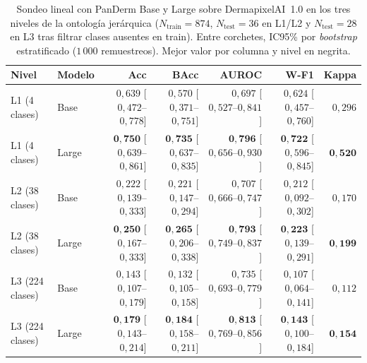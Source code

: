 \begin{table}[H]
\centering
\footnotesize
\setlength{\tabcolsep}{4pt}
\renewcommand{\arraystretch}{0.95}
\caption{Sondeo lineal con PanDerm Base y Large sobre
DermapixelAI~1.0 en los tres niveles de la ontología jerárquica
($N_{\mathrm{train}} = 874$, $N_{\mathrm{test}} = 36$ en L1/L2 y
$N_{\mathrm{test}} = 28$ en L3 tras filtrar clases ausentes en
train). Entre corchetes, IC95\% por \emph{bootstrap} estratificado
($1\,000$ remuestreos). Mejor valor por columna y nivel en
negrita.}
\label{tab:dermapixel-lp}
\begin{tabular}{llrrrrr}
\hline
Nivel & Modelo & Acc & BAcc & AUROC & W-F1 & Kappa \\
\hline
L1 (4 clases)   & Base  & $0{,}639$ [$0{,}472$--$0{,}778$]
                        & $0{,}570$ [$0{,}371$--$0{,}751$]
                        & $0{,}697$ [$0{,}527$--$0{,}841$]
                        & $0{,}624$ [$0{,}457$--$0{,}760$]
                        & $0{,}296$ \\
L1 (4 clases)   & Large & $\mathbf{0{,}750}$ [$0{,}639$--$0{,}861$]
                        & $\mathbf{0{,}735}$ [$0{,}637$--$0{,}835$]
                        & $\mathbf{0{,}796}$ [$0{,}656$--$0{,}930$]
                        & $\mathbf{0{,}722}$ [$0{,}596$--$0{,}845$]
                        & $\mathbf{0{,}520}$ \\
L2 (38 clases)  & Base  & $0{,}222$ [$0{,}139$--$0{,}333$]
                        & $0{,}221$ [$0{,}147$--$0{,}294$]
                        & $0{,}707$ [$0{,}666$--$0{,}747$]
                        & $0{,}212$ [$0{,}092$--$0{,}302$]
                        & $0{,}170$ \\
L2 (38 clases)  & Large & $\mathbf{0{,}250}$ [$0{,}167$--$0{,}333$]
                        & $\mathbf{0{,}265}$ [$0{,}206$--$0{,}338$]
                        & $\mathbf{0{,}793}$ [$0{,}749$--$0{,}837$]
                        & $\mathbf{0{,}223}$ [$0{,}139$--$0{,}291$]
                        & $\mathbf{0{,}199}$ \\
L3 (224 clases) & Base  & $0{,}143$ [$0{,}107$--$0{,}179$]
                        & $0{,}132$ [$0{,}105$--$0{,}158$]
                        & $0{,}735$ [$0{,}693$--$0{,}779$]
                        & $0{,}107$ [$0{,}064$--$0{,}141$]
                        & $0{,}112$ \\
L3 (224 clases) & Large & $\mathbf{0{,}179}$ [$0{,}143$--$0{,}214$]
                        & $\mathbf{0{,}184}$ [$0{,}158$--$0{,}211$]
                        & $\mathbf{0{,}813}$ [$0{,}769$--$0{,}856$]
                        & $\mathbf{0{,}143}$ [$0{,}100$--$0{,}184$]
                        & $\mathbf{0{,}154}$ \\
\hline
\end{tabular}
\end{table}

